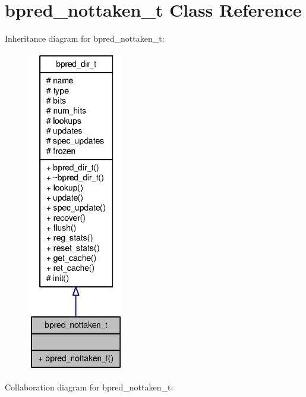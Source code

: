 \section{bpred\_\-nottaken\_\-t Class Reference}
\label{classbpred__nottaken__t}
Inheritance diagram for bpred\_\-nottaken\_\-t:\nopagebreak
\begin{figure}[H]
\begin{center}
\leavevmode
\includegraphics[height=400pt]{classbpred__nottaken__t__inherit__graph}
\end{center}
\end{figure}
Collaboration diagram for bpred\_\-nottaken\_\-t:\nopagebreak
